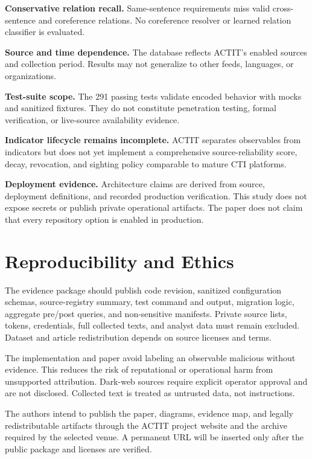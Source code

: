\documentclass[conference]{IEEEtran}
\begin{document}
\textbf{Conservative relation recall.} Same-sentence requirements miss valid cross-sentence and coreference relations. No coreference resolver or learned relation classifier is evaluated.

\textbf{Source and time dependence.} The database reflects ACTIT's enabled sources and collection period. Results may not generalize to other feeds, languages, or organizations.

\textbf{Test-suite scope.} The 291 passing tests validate encoded behavior with mocks and sanitized fixtures. They do not constitute penetration testing, formal verification, or live-source availability evidence.

\textbf{Indicator lifecycle remains incomplete.} ACTIT separates observables from indicators but does not yet implement a comprehensive source-reliability score, decay, revocation, and sighting policy comparable to mature CTI platforms.

\textbf{Deployment evidence.} Architecture claims are derived from source, deployment definitions, and recorded production verification. This study does not expose secrets or publish private operational artifacts. The paper does not claim that every repository option is enabled in production.

\section{Reproducibility and Ethics}
The evidence package should publish code revision, sanitized configuration schemas, source-registry summary, test command and output, migration logic, aggregate pre/post queries, and non-sensitive manifests. Private source lists, tokens, credentials, full collected texts, and analyst data must remain excluded. Dataset and article redistribution depends on source licenses and terms.

The implementation and paper avoid labeling an observable malicious without evidence. This reduces the risk of reputational or operational harm from unsupported attribution. Dark-web sources require explicit operator approval and are not disclosed. Collected text is treated as untrusted data, not instructions.

The authors intend to publish the paper, diagrams, evidence map, and legally redistributable artifacts through the ACTIT project website and the archive required by the selected venue. A permanent URL will be inserted only after the public package and licenses are verified.
\end{document}
